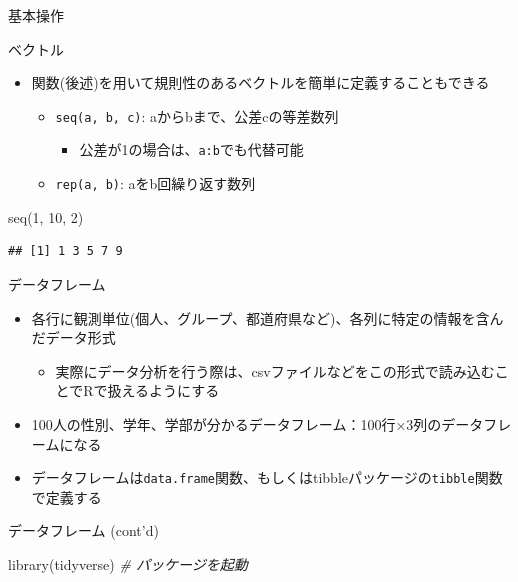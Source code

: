 \documentclass[
  ignorenonframetext,
]{beamer}
\newenvironment{Shaded}{\begin{snugshade}}{\end{snugshade}}
\newcommand{\CommentTok}[1]{\textcolor[rgb]{0.56,0.35,0.01}{\textit{#1}}}
\newcommand{\DecValTok}[1]{\textcolor[rgb]{0.00,0.00,0.81}{#1}}
\newcommand{\FunctionTok}[1]{\textcolor[rgb]{0.00,0.00,0.00}{#1}}
\newcommand{\NormalTok}[1]{#1}
\providecommand{\tightlist}{%
  \setlength{\itemsep}{0pt}\setlength{\parskip}{0pt}}
\begin{document}
\begin{frame}[fragile]{基本操作}
\begin{block}{ベクトル}
\begin{itemize}
\tightlist
\item
  関数(後述)を用いて規則性のあるベクトルを簡単に定義することもできる

  \begin{itemize}
  \tightlist
  \item
    \texttt{seq(a,\ b,\ c)}: aからbまで、公差cの等差数列

    \begin{itemize}
    \tightlist
    \item
      公差が1の場合は、\texttt{a:b}でも代替可能
    \end{itemize}
  \item
    \texttt{rep(a,\ b)}: aをb回繰り返す数列
  \end{itemize}
\end{itemize}

\begin{Shaded}
\begin{Highlighting}[]
\FunctionTok{seq}\NormalTok{(}\DecValTok{1}\NormalTok{, }\DecValTok{10}\NormalTok{, }\DecValTok{2}\NormalTok{)}
\end{Highlighting}
\end{Shaded}

\begin{verbatim}
## [1] 1 3 5 7 9
\end{verbatim}
\end{block}

\begin{block}{データフレーム}
\protect\hypertarget{ux30c7ux30fcux30bfux30d5ux30ecux30fcux30e0}{}
\begin{itemize}
\item
  各行に観測単位(個人、グループ、都道府県など)、各列に特定の情報を含んだデータ形式

  \begin{itemize}
  \tightlist
  \item
    実際にデータ分析を行う際は、csvファイルなどをこの形式で読み込むことでRで扱えるようにする
  \end{itemize}
\item
  100人の性別、学年、学部が分かるデータフレーム：100行×3列のデータフレームになる
\item
  データフレームは\texttt{data.frame}関数、もしくはtibbleパッケージの\texttt{tibble}関数で定義する
\end{itemize}
\end{block}

\begin{block}{データフレーム (cont'd)}
\protect\hypertarget{ux30c7ux30fcux30bfux30d5ux30ecux30fcux30e0-contd}{}
\begin{Shaded}
\begin{Highlighting}[]
\FunctionTok{library}\NormalTok{(tidyverse) }\CommentTok{\# パッケージを起動}
\end{Highlighting}
\end{Shaded}


\end{block}
\end{frame}
\end{document}
